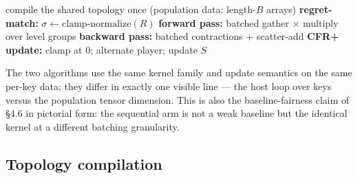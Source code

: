 \documentclass[11pt]{article}
\begin{document}
\begin{algorithm}[t]
\caption{Fused population CFR+ (this work)}
\label{alg:fused}
\begin{algorithmic}[1]
\State compile the shared topology once (population data: length-$B$ arrays)
 
  \State \textbf{regret-match:} $\sigma \gets \text{clamp-normalize}(R)$
  \State \textbf{forward pass:} batched gather $\times$ multiply over level groups
  \State \textbf{backward pass:} batched contractions + scatter-add
  \State \textbf{CFR+ update:} clamp at $0$; alternate player; update $S$
\EndFor
\end{algorithmic}
\end{algorithm}

The two algorithms use the same kernel family and update semantics on the same per-key
data; they differ in exactly one visible line --- the host loop over keys versus the
population tensor dimension. This is
also the baseline-fairness claim of \S4.6 in pictorial form: the sequential arm is not a
weak baseline but the identical kernel at a different batching granularity.

\subsection{Topology compilation}
\end{document}
